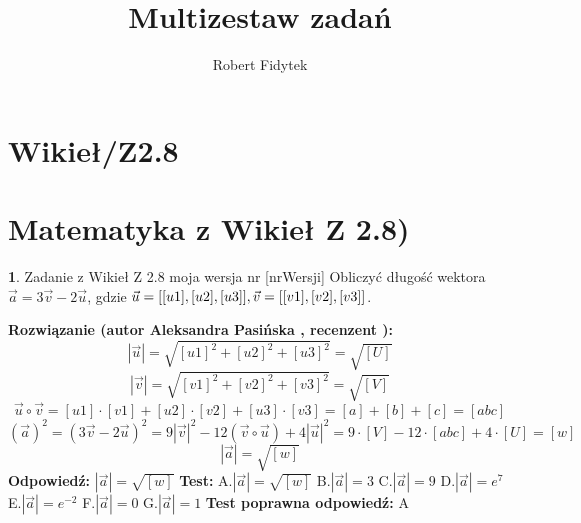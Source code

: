 \documentclass[12pt, a4paper]{article}
\title{Multizestaw zadań}
\author{Robert Fidytek}
\date{}
\theoremstyle{definition} %
\newtheorem{zad}{}
\newcommand{\kategoria}[1]{\section{#1}} %
\newcommand{\zadStart}[1]{\begin{zad}#1\newline} %
\newcommand{\zadStop}{\end{zad}}   %
\newcommand{\rozwStart}[2]{\noindent \textbf{Rozwiązanie (autor #1 , recenzent #2): }\newline} %
\newcommand{\rozwStop}{\newline}                                            %
\newcommand{\odpStart}{\noindent \textbf{Odpowiedź:}\newline}    %
\newcommand{\odpStop}{\newline}                                             %
\newcommand{\testStart}{\noindent \textbf{Test:}\newline} %
\newcommand{\testStop}{\newline} %
\newcommand{\kluczStart}{\noindent \textbf{Test poprawna odpowiedź:}\newline} %
\newcommand{\kluczStop}{\newline} %
\begin{document}
\maketitle


\kategoria{Wikieł/Z2.8}
\kategoria{Matematyka z Wikieł Z 2.8)}
\zadStart{Zadanie z Wikieł Z 2.8 moja wersja nr [nrWersji]}
Obliczyć długość wektora $\vec a=3\vec v-2\vec u$, gdzie $\vec u=[[u1],[u2],[u3]],\\ \vec v=[[v1],[v2],[v3]]$.
\zadStop
\rozwStart{Aleksandra Pasińska}{}
$$|\vec u|=\sqrt{[u1]^2+[u2]^2+[u3]^2}=\sqrt{[U]}$$ 
$$|\vec v|=\sqrt{[v1]^2+[v2]^2+[v3]^2}=\sqrt{[V]}$$ 
$$\vec u\circ \vec v=[u1]\cdot [v1]+[u2]\cdot [v2]+[u3]\cdot [v3]=[a]+[b]+[c]=[abc]$$
$$(\vec a)^2=(3\vec v-2\vec u)^2=9|\vec v|^2-12(\vec v \circ \vec u)+4|\vec u|^2=9\cdot [V]-12\cdot [abc]+4\cdot [U]=[w]$$
$$|\vec a|=\sqrt{[w]}$$
\rozwStop
\odpStart
$|\vec a|=\sqrt{[w]}$
\odpStop
\testStart
A.$|\vec a|=\sqrt{[w]}$
B.$|\vec a|=3$
C.$|\vec a|=9$
D.$|\vec a|=e^{7}$
E.$|\vec a|=e^{-2}$
F.$|\vec a|=0$
G.$|\vec a|=1$
\testStop
\kluczStart
A
\kluczStop
\end{document}
